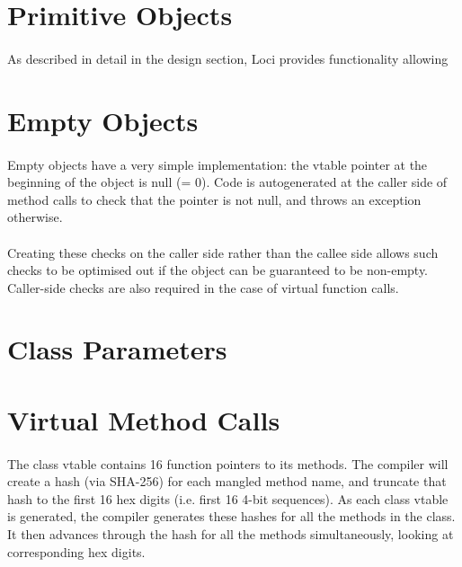 \documentclass[12pt,twoside,notitlepage]{report}
\begin{document}
\section{Primitive Objects}

\paragraph{}
As described in detail in the design section, Loci provides functionality allowing 

\section{Empty Objects}

\paragraph{}
Empty objects have a very simple implementation: the vtable pointer at the beginning of the object is null (= 0). Code is autogenerated at the caller side of method calls to check that the pointer is not null, and throws an exception otherwise.

\paragraph{}
Creating these checks on the caller side rather than the callee side allows such checks to be optimised out if the object can be guaranteed to be non-empty. Caller-side checks are also required in the case of virtual function calls.

\section{Class Parameters}

\paragraph{}


\section{Virtual Method Calls}

\paragraph{}
The class vtable contains 16 function pointers to its methods. The compiler will create a hash (via SHA-256) for each mangled method name, and truncate that hash to the first 16 hex digits (i.e. first 16 4-bit sequences). As each class vtable is generated, the compiler generates these hashes for all the methods in the class. It then advances through the hash for all the methods simultaneously, looking at corresponding hex digits.
\end{document}

